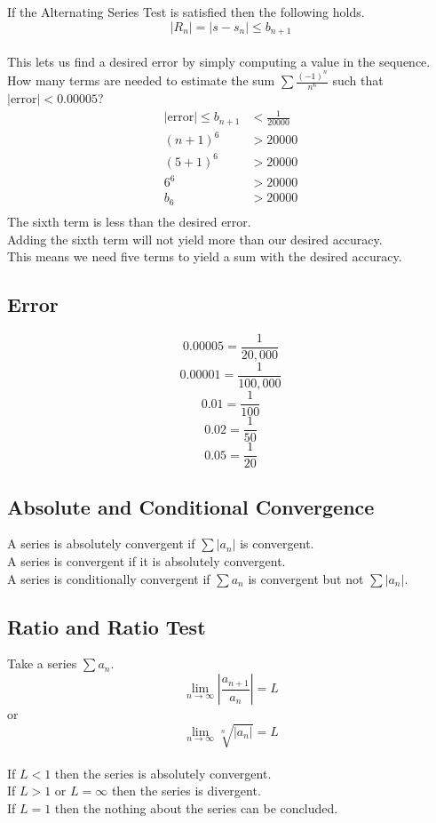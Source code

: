 \documentclass[12pt]{article}
\begin{document}
If the Alternating Series Test is satisfied then the following holds.
\\
\begin{displaymath}
\left|R_n\right| = \left|s - s_n\right| \leq b_{n+1}
\end{displaymath}
\\
This lets us find a desired error by simply computing a value in the sequence.
\\
How many terms are needed to estimate the sum $\sum \frac{(-1)^n}{n^6}$ such that $|\text{error}| < 0.00005$?\\
\begin{align*}
\left|\text{error}\right| \leq b_{n+1} &< \frac{1}{20000}\\
(n+1)^6 &> 20000\\
(5+1)^6 &> 20000\\
    6^6 &> 20000\\
    b_6 &> 20000\\
\end{align*}
The sixth term is less than the desired error.\\
Adding the sixth term will not yield more than our desired accuracy.\\
This means we need five terms to yield a sum with the desired accuracy.


\subsection{Error}

$$0.00005 = \frac{1}{20,000}$$
$$0.00001 = \frac{1}{100,000}$$
$$0.01 = \frac{1}{100}$$
$$0.02 = \frac{1}{50}$$
$$0.05 = \frac{1}{20}$$


\subsection{Absolute and Conditional Convergence}

A series is absolutely convergent if $\sum \left|a_n\right|$ is convergent.\\
A series is convergent if it is absolutely convergent.\\
A series is conditionally convergent if $\sum a_n$ is convergent but not $\sum \left|a_n\right|$.\\


\subsection{Ratio and Ratio Test}

Take a series $\sum a_n$.
\\
\begin{displaymath}
\lim_{n\to\infty} \left|\frac{a_{n+1}}{a_n}\right| = L
\end{displaymath}
or\\
\begin{displaymath}
\lim_{n\to\infty} \sqrt[n]{\left|a_n\right|} = L
\end{displaymath}
\\
If $L < 1$ then the series is absolutely convergent.\\
If $L > 1\text{ or }L = \infty$ then the series is divergent.\\
If $L = 1$ then the nothing about the series can be concluded.
\end{document}
